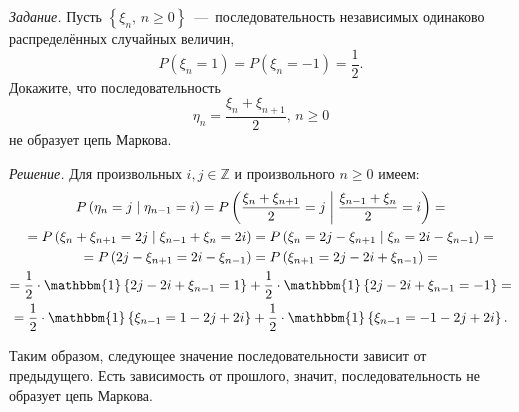 \textit{Задание.}
Пусть $ \left\{ \xi_n, \, n \geq 0 \right\} $~---~последовательность независимых одинаково
распределённых случайных величин,
\begin{equation*}
  P \left( \xi_n = 1 \right) =
  P \left( \xi_n = -1 \right) =
  \frac{1}{2}.
\end{equation*}
Докажите, что последовательность
\begin{equation*}
  \eta_n = \frac{ \xi_n + \xi_{n + 1}}{2}, \,
  n \geq 0
\end{equation*}
не образует цепь Маркова.

\textit{Решение.}
Для произвольных $i, j \in \mathbb{Z}$ и произвольного $n \geq 0$ имеем:
\begin{gather*}
  P \left( \eta_n = j \; \middle| \; \eta_{n - 1} = i \right) =
  P \left(
    \frac{ \xi_n + \xi_{n + 1}}{2} = j \; \middle| \; \frac{ \xi_{n - 1} + \xi_n}{2} = i
  \right) = \\
  = P \left( \xi_n + \xi_{n + 1} = 2j \; \middle| \; \xi_{n - 1} + \xi_n = 2i \right) =
  P \left( \xi_n = 2j - \xi_{n + 1} \; \middle| \; \xi_n = 2i - \xi_{n - 1} \right) = \\
  = P \left( 2j - \xi_{n + 1} = 2i - \xi_{n - 1} \right) =
  P \left( \xi_{n + 1} = 2j - 2i + \xi_{n - 1} \right) = \\
  = \frac{1}{2} \cdot \mathbbm{1} \left\{ 2j - 2i + \xi_{n - 1} = 1 \right\} +
  \frac{1}{2} \cdot \mathbbm{1} \left\{ 2j - 2i + \xi_{n - 1} = -1 \right\} = \\
  = \frac{1}{2} \cdot \mathbbm{1} \left\{ \xi_{n - 1} = 1 - 2j + 2i \right\} +
  \frac{1}{2} \cdot \mathbbm{1} \left\{ \xi_{n - 1} = -1 - 2j + 2i \right\}.
\end{gather*}

Таким образом, следующее значение последовательности зависит от предыдущего.
Есть зависимость от прошлого, значит, последовательность не образует цепь Маркова.

